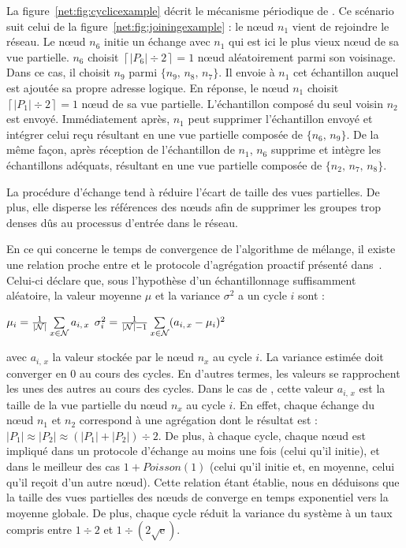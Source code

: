 La figure~\ref{net:fig:cyclicexample} décrit le mécanisme périodique de
\SPRAY. Ce scénario suit celui de la figure~\ref{net:fig:joiningexample} : le
nœud $n_1$ vient de rejoindre le réseau. Le nœud $n_6$ initie un échange avec
$n_1$ qui est ici le plus vieux nœud de sa vue partielle. $n_6$ choisit
$\left\lceil{|P_6|\div 2}\right\rceil = 1$ nœud aléatoirement parmi son
voisinage. Dans ce cas, il choisit $n_9$ parmi $\{n_9,\,n_8,\,n_7\}$. Il envoie
à $n_1$ cet échantillon auquel est ajoutée sa propre adresse logique. En
réponse, le nœud $n_1$ choisit $\left\lceil{|P_1|\div 2}\right\rceil = 1$ nœud
de sa vue partielle. L'échantillon composé du seul voisin $n_2$ est
envoyé. Immédiatement après, $n_1$ peut supprimer l'échantillon envoyé et
intégrer celui reçu résultant en une vue partielle composée de $\{n_6,\, n_9\}$.
De la même façon, après réception de l'échantillon de $n_1$, $n_6$ supprime et
intègre les échantillons adéquats, résultant en une vue partielle composée de
$\{n_2,\,n_7,\,n_8\}$.

La procédure d'échange tend à réduire l'écart de taille des vues partielles. De
plus, elle disperse les références des nœuds afin de supprimer les groupes trop
denses dûs au processus d'entrée dans le réseau.

En ce qui concerne le temps de convergence de l'algorithme de mélange, il existe
une relation proche entre \SPRAY et le protocole d'agrégation proactif
présenté dans~\cite{jelasity2004epidemic, montresor2004robust}. Celui-ci déclare
que, sous l'hypothèse d'un échantillonnage suffisamment aléatoire, la valeur
moyenne $\mu$ et la variance $\sigma^2$ a un cycle $i$ sont :
\begin{center}
  $\mu_i = {1\over{|\mathcal{N}|}} \sum\limits_{x \in \mathcal{N}} a_{i,\,x}$
  \hfill
  $\sigma^2_i = {1\over{|\mathcal{N}|-1}}\sum\limits_{x \in \mathcal{N}}
  (a_{i,\,x} - \mu_i)^2$
\end{center}
avec $a_{i,\,x}$ la valeur stockée par le nœud $n_x$ au cycle $i$. La variance
estimée doit converger en 0 au cours des cycles. En d'autres termes, les valeurs
se rapprochent les unes des autres au cours des cycles. Dans le cas de \SPRAY,
cette valeur $a_{i,\,x}$ est la taille de la vue partielle du nœud $n_x$ au
cycle $i$. En effet, chaque échange du nœud $n_1$ et $n_2$ correspond à une
agrégation dont le résultat est :
$|P_1|\approx|P_2|\approx{(|P_1| + |P_2|) \div 2}$.  De plus, à chaque cycle,
chaque nœud est impliqué dans un protocole d'échange au moins une fois (celui
qu'il initie), et dans le meilleur des cas $1+Poisson(1)$ (celui qu'il initie
et, en moyenne, celui qu'il reçoit d'un autre nœud). Cette relation étant
établie, nous en déduisons que la taille des vues partielles des nœuds de \SPRAY
converge en temps exponentiel vers la moyenne globale. De plus, chaque cycle
réduit la variance du système à un taux compris entre ${1\div 2}$ et
$1\div ({2\sqrt{\text{e}}})$.


